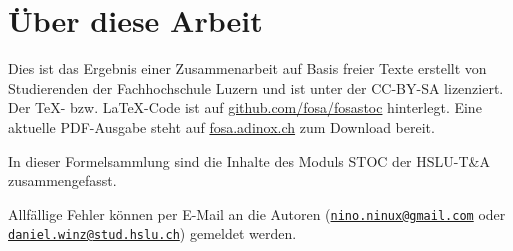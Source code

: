 



\section*{Über diese Arbeit}
Dies ist das Ergebnis einer Zusammenarbeit auf Basis freier Texte erstellt von 
Studierenden der Fachhochschule Luzern und ist unter der CC-BY-SA lizenziert. Der 
\TeX - bzw. \LaTeX -Code ist auf \url{github.com/fosa/fosastoc} hinterlegt. 
Eine aktuelle PDF-Ausgabe steht auf \url{fosa.adinox.ch} zum Download bereit.

In dieser Formelsammlung sind die Inhalte des Moduls STOC der HSLU-T\&A 
zusammengefasst. 

Allfällige Fehler können per E-Mail an die Autoren 
(\href{mailto:nino.ninux@gmail.com}{\nolinkurl{nino.ninux@gmail.com}} oder 
\href{mailto:daniel.winz@stud.hslu.ch}{\nolinkurl{daniel.winz@stud.hslu.ch}}) 
gemeldet werden. 
